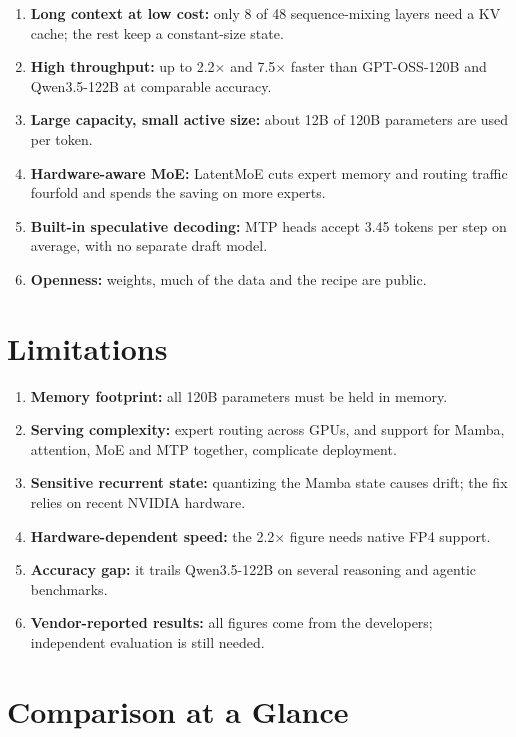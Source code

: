 \begin{enumerate}
  \item \textbf{Long context at low cost:} only 8 of 48 sequence-mixing layers
        need a KV cache; the rest keep a constant-size state.
  \item \textbf{High throughput:} up to 2.2$\times$ and 7.5$\times$ faster
        than GPT-OSS-120B and Qwen3.5-122B at comparable accuracy.
  \item \textbf{Large capacity, small active size:} about 12B of 120B
        parameters are used per token.
  \item \textbf{Hardware-aware MoE:} LatentMoE cuts expert memory and routing
        traffic fourfold and spends the saving on more experts.
  \item \textbf{Built-in speculative decoding:} MTP heads accept 3.45 tokens
        per step on average, with no separate draft model.
  \item \textbf{Openness:} weights, much of the data and the recipe are
        public.
\end{enumerate}

\section{Limitations}

\begin{enumerate}
  \item \textbf{Memory footprint:} all 120B parameters must be held in memory.
  \item \textbf{Serving complexity:} expert routing across GPUs, and support
        for Mamba, attention, MoE and MTP together, complicate deployment.
  \item \textbf{Sensitive recurrent state:} quantizing the Mamba state causes
        drift; the fix relies on recent NVIDIA hardware.
  \item \textbf{Hardware-dependent speed:} the 2.2$\times$ figure needs native
        FP4 support.
  \item \textbf{Accuracy gap:} it trails Qwen3.5-122B on several reasoning and
        agentic benchmarks.
  \item \textbf{Vendor-reported results:} all figures come from the developers;
        independent evaluation is still needed.
\end{enumerate}

\section{Comparison at a Glance}

